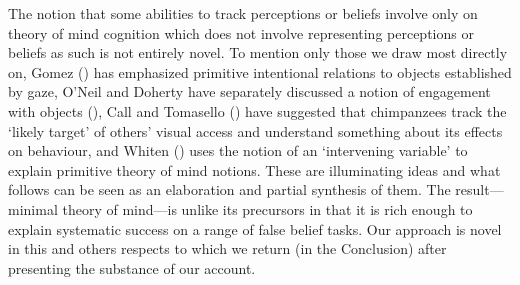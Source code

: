\documentclass[12pt,\papersize]{extarticle}
\begin{document}
The notion that some abilities to track perceptions or beliefs involve only on theory of mind cognition which does not involve representing perceptions or beliefs as such is not entirely novel.
To mention only those we draw most directly on, Gomez (\citeyear[][p.\ 730]{en_1259}) has emphasized primitive intentional relations to objects established by gaze, O’Neil and Doherty have separately discussed a notion of engagement with objects (\citealp{en_1159, en_1140}), Call and Tomasello (\citeyear[][p.\ 58]{en_1669}) have suggested that chimpanzees track the `likely target' of others’ visual access and understand something about its effects on behaviour, and Whiten (\citeyear[]{en_1415, en_1416}) uses the notion of an `intervening variable' to explain primitive theory of mind notions.  These are illuminating ideas and what follows can be seen as an elaboration and partial synthesis of them.  
The result---minimal theory of mind---is unlike its precursors in that it is rich enough to explain systematic success on a range of false belief tasks.  Our approach is novel in this and others respects to which we return (in the Conclusion) after presenting the substance of our account.



%
%
\end{document}
